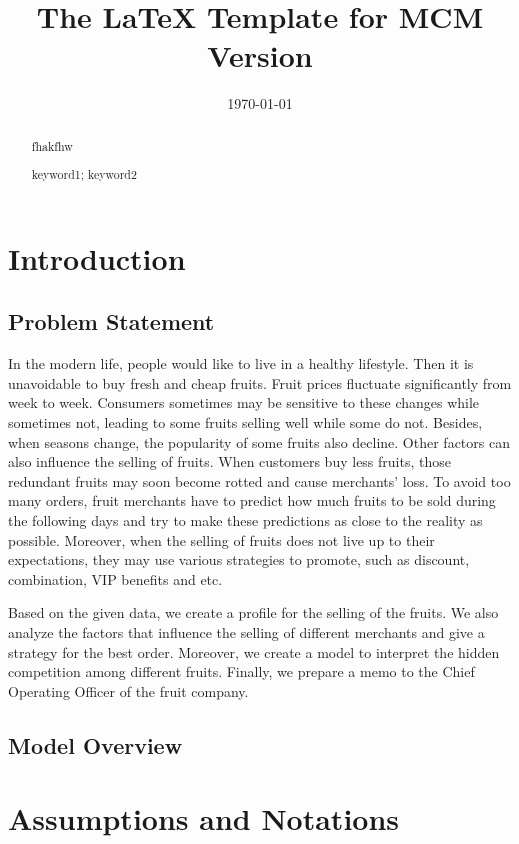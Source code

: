 \documentclass{mcmthesis}
\title{The \LaTeX{} Template for MCM Version \MCMversion}
\author{}
\date{\today}
\begin{document}
\begin{abstract}
fhakfhw
\begin{keywords}
keyword1; keyword2
\end{keywords}
\end{abstract}
\maketitle
\tableofcontents

\newpage
\section{Introduction}

\subsection{Problem Statement}
In the modern life, people would like to live in a healthy lifestyle. Then it is unavoidable to buy fresh and cheap fruits. Fruit prices fluctuate significantly from week to week. Consumers sometimes may be sensitive to these changes while sometimes not, leading to some fruits selling well while some do not. Besides, when seasons change, the popularity of some fruits also decline. Other factors can also influence the selling of fruits. When customers buy less fruits, those redundant fruits may soon become rotted and cause merchants’ loss. To avoid too many orders, fruit merchants have to predict how much fruits to be sold during the following days and try to make these predictions as close to the reality as possible. Moreover, when the selling of fruits does not live up to their expectations, they may use various strategies to promote, such as discount, combination, VIP benefits and etc.

Based on the given data, we create a profile for the selling of the fruits. We also analyze the factors that influence the selling of different merchants and give a strategy for the best order. Moreover, we create a model to interpret the hidden competition among different fruits. Finally, we prepare a memo to the Chief Operating Officer of the fruit company.
\subsection{Model Overview}

\section{Assumptions and Notations}
\end{document}

